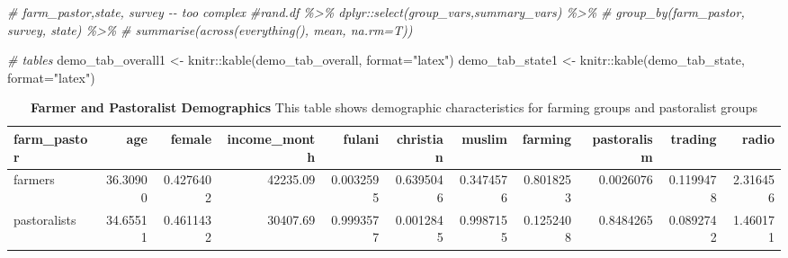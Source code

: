 \documentclass[
]{article}
\newenvironment{Shaded}{\begin{snugshade}}{\end{snugshade}}
\newcommand{\AttributeTok}[1]{\textcolor[rgb]{0.77,0.63,0.00}{#1}}
\newcommand{\CommentTok}[1]{\textcolor[rgb]{0.56,0.35,0.01}{\textit{#1}}}
\newcommand{\FunctionTok}[1]{\textcolor[rgb]{0.00,0.00,0.00}{#1}}
\newcommand{\NormalTok}[1]{#1}
\newcommand{\OtherTok}[1]{\textcolor[rgb]{0.56,0.35,0.01}{#1}}
\newcommand{\SpecialCharTok}[1]{\textcolor[rgb]{0.00,0.00,0.00}{#1}}
\newcommand{\StringTok}[1]{\textcolor[rgb]{0.31,0.60,0.02}{#1}}
\begin{document}
\begin{Shaded}
\begin{Highlighting}[]
\CommentTok{\# farm\_pastor,state, survey {-}{-} too complex}
\CommentTok{\#rand.df \%\textgreater{}\% dplyr::select(group\_vars,summary\_vars) \%\textgreater{}\%}
\CommentTok{\#  group\_by(farm\_pastor, survey, state) \%\textgreater{}\%}
\CommentTok{\#  summarise(across(everything(), mean, na.rm=T))}

\CommentTok{\# tables}
\NormalTok{demo\_tab\_overall1 }\OtherTok{\textless{}{-}}\NormalTok{ knitr}\SpecialCharTok{::}\FunctionTok{kable}\NormalTok{(demo\_tab\_overall, }\AttributeTok{format=}\StringTok{"latex"}\NormalTok{)}
\NormalTok{demo\_tab\_state1 }\OtherTok{\textless{}{-}}\NormalTok{ knitr}\SpecialCharTok{::}\FunctionTok{kable}\NormalTok{(demo\_tab\_state, }\AttributeTok{format=}\StringTok{"latex"}\NormalTok{)}
\end{Highlighting}
\end{Shaded}

\begin{table}[H]
\begin{center}
\label{tab:demo_tab_overall1}
\caption{\textbf{Farmer and Pastoralist Demographics} This table shows demographic characteristics for farming groups and pastoralist groups}
\smallskip

\begin{tabular}{l|r|r|r|r|r|r|r|r|r|r}
\hline
farm\_pastor & age & female & income\_month & fulani & christian & muslim & farming & pastoralism & trading & radio\\
\hline
farmers & 36.30900 & 0.4276402 & 42235.09 & 0.0032595 & 0.6395046 & 0.3474576 & 0.8018253 & 0.0026076 & 0.1199478 & 2.316456\\
\hline
pastoralists & 34.65511 & 0.4611432 & 30407.69 & 0.9993577 & 0.0012845 & 0.9987155 & 0.1252408 & 0.8484265 & 0.0892742 & 1.460171\\
\hline
\end{tabular}


\end{center}
\end{table}
\end{document}
